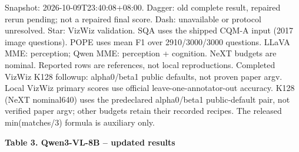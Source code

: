 \documentclass[10pt,a4paper]{article}
\begin{document}
{\footnotesize Snapshot: 2026-10-09T23:40:08+08:00. Dagger: old complete result, repaired rerun pending; not a repaired final score. Dash: unavailable or protocol unresolved. Star: VizWiz validation. SQA uses the shipped CQM-A input (2017 image questions). POPE uses mean F1 over 2910/3000/3000 questions. LLaVA MME: perception; Qwen MME: perception + cognition. NeXT budgets are nominal. Reported rows are references, not local reproductions. Completed VizWiz K128 followup: alpha0/beta1 public defaults, not proven paper argv. Local VizWiz primary scores use official leave-one-annotator-out accuracy. K128 (NeXT nominal640) uses the predeclared alpha0/beta1 public-default pair, not verified paper argv; other budgets retain their recorded recipes. The released min(matches/3) formula is auxiliary only.\par}
\newpage
{\large\textbf{Table 3. Qwen3-VL-8B -- updated results}}\par\medskip
\begingroup\setlength{\tabcolsep}{3.2pt}\renewcommand{\arraystretch}{1.03}
\end{document}
